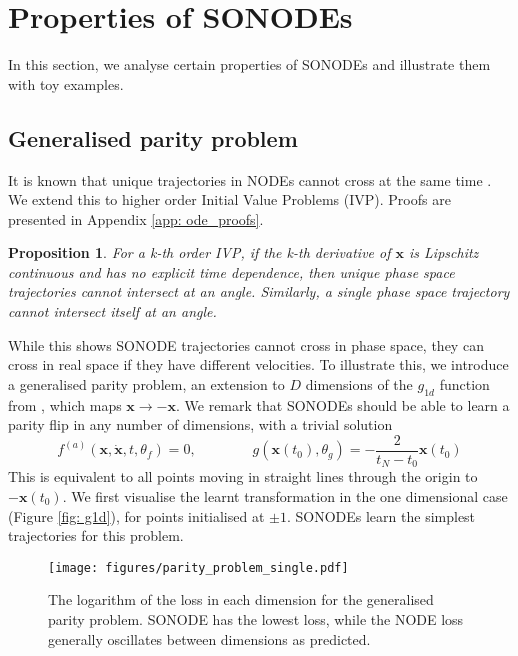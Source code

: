 \documentclass{article}
\newtheorem{proposition}[theorem]{Proposition}
\theoremstyle{remark}
\theoremstyle{definition}
\begin{document}
\section{Properties of SONODEs}
\label{sec: node_problems}

In this section, we analyse certain properties of SONODEs and illustrate them with toy examples.

\subsection{Generalised parity problem}

It is known that unique trajectories in NODEs cannot cross at the same time \citep{dupont2019augmented, massaroli2020dissecting}. We extend this to higher order Initial Value Problems (IVP). Proofs are presented in Appendix \ref{app: ode_proofs}.

\begin{proposition}
\label{prop: no_crossing_different}
For a k-th order IVP, if the k-th derivative of $\mathbf{x}$ is Lipschitz continuous and has no explicit time dependence, then unique phase space trajectories cannot intersect at an angle. Similarly, a single phase space trajectory cannot intersect itself at an angle.
\end{proposition}

While this shows SONODE trajectories cannot cross in phase space, they can cross in real space if they have different velocities. To illustrate this, we introduce a generalised parity problem, an extension to $D$ dimensions of the $g_{1d}$ function from \citet{dupont2019augmented}, which maps $\mathbf{x} \to -\mathbf{x}$. We remark that SONODEs should be able to learn a parity flip in any number of dimensions, with a trivial solution
\begin{equation}
\label{eqn: sonode_parity_solution}
f^{(a)}(\mathbf{x}, \dot{\mathbf{x}}, t, \theta_{f}) = 0,
\qquad
\qquad
g(\mathbf{x}(t_{0}), \theta_{g}) = -\frac{2}{t_{N}-t_{0}}\mathbf{x}(t_{0})
\end{equation}
This is equivalent to all points moving in straight lines through the origin to $-\mathbf{x}(t_{0})$. We first visualise the learnt transformation in the one dimensional case (Figure \ref{fig: g1d}), for points initialised at $\pm1$. SONODEs learn the simplest trajectories for this problem.

\begin{wrapfigure}{li}{0.4\textwidth}
\centering
    \texttt{[image: figures/parity\_problem\_single.pdf]}
    \vspace{-10pt}
    \caption{The logarithm of the loss in each dimension for the generalised parity problem. SONODE has the lowest loss, while the NODE loss generally oscillates between dimensions as predicted.}
    \label{fig: parity_multi_dimensions}
\end{wrapfigure}
\end{document}
